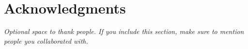 \section{Acknowledgments}
\label{sec:acknowledgments}

\emph{Optional space to thank people.
If you include this section, make sure to mention people you collaborated with.}